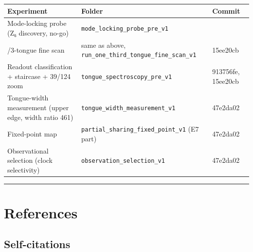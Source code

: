 \documentclass[
  a4paper,
]{article}
\newcounter{none} %
\begin{document}
{\def\LTcaptype{none} %
\begin{longtable}[]{@{}
  >{\raggedright\arraybackslash}p{}
  >{\raggedright\arraybackslash}p{}
  >{\raggedright\arraybackslash}p{}@{}}
\toprule\noalign{}
\begin{minipage}[b]{\linewidth}\raggedright
Experiment
\end{minipage} & \begin{minipage}[b]{\linewidth}\raggedright
Folder
\end{minipage} & \begin{minipage}[b]{\linewidth}\raggedright
Commit
\end{minipage} \\
\midrule\noalign{}
\endhead
\bottomrule\noalign{}
\endlastfoot
Mode-locking probe (Z₆ discovery, no-go) &
\texttt{mode\_locking\_probe\_pre\_v1} & 56453653 \\
1/3-tongue fine scan & same as above,
\texttt{run\_one\_third\_tongue\_fine\_scan\_v1} & 15ee20cb \\
Readout classification + staircase + 39/124 zoom &
\texttt{tongue\_spectroscopy\_pre\_v1} & 913756fe, 15ee20cb \\
Tongue-width measurement (upper edge, width ratio 461) &
\texttt{tongue\_width\_measurement\_v1} & 47e2da02 \\
Fixed-point map & \texttt{partial\_sharing\_fixed\_point\_v1} (E7 part)
& 47e2da02 \\
Observational selection (clock selectivity) &
\texttt{observation\_selection\_v1} & 47e2da02 \\
\end{longtable}
}

\begin{center}\rule{0.5\linewidth}{0.5pt}\end{center}

\section{References}\label{references}

\subsection{Self-citations}\label{self-citations}
\end{document}
